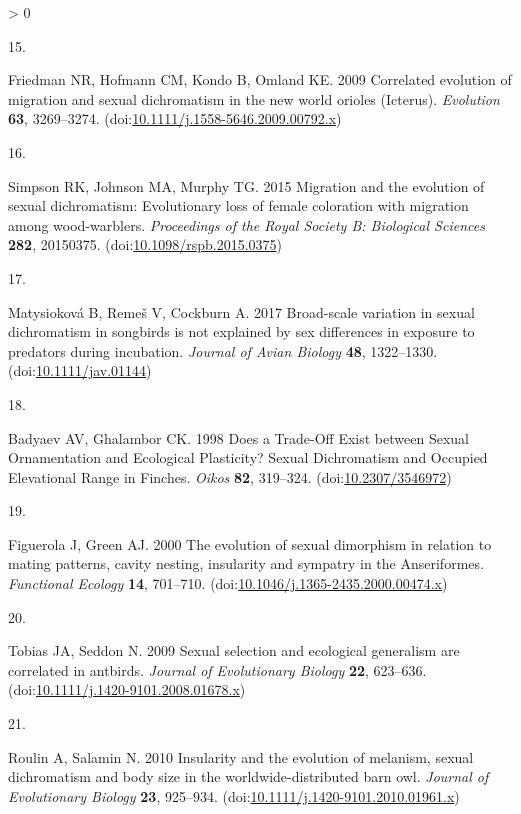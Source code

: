 \documentclass[
  a4paper,
]{article}
\newlength{\cslhangindent}
\newlength{\csllabelwidth}
\newenvironment{CSLReferences}[2] %
 {%
  \setlength{\parindent}{0pt}
  \ifodd #1 \everypar{\setlength{\hangindent}{\cslhangindent}}\ignorespaces\fi
  \ifnum #2 > 0
  \setlength{\parskip}{#2\baselineskip}
  \fi
 }%
 {}
\newcommand{\CSLLeftMargin}[1]{\parbox[t]{\csllabelwidth}{#1}}
\newcommand{\CSLRightInline}[1]{\parbox[t]{\linewidth - \csllabelwidth}{#1}\break}
\begin{document}
\begin{CSLReferences}{0}{0}
\leavevmode\hypertarget{ref-friedman2009}{}%
\CSLLeftMargin{15. }
\CSLRightInline{Friedman NR, Hofmann CM, Kondo B, Omland KE. 2009
Correlated evolution of migration and sexual dichromatism in the new
world orioles ({Icterus}). \emph{Evolution} \textbf{63}, 3269--3274.
(doi:\href{https://doi.org/10.1111/j.1558-5646.2009.00792.x}{10.1111/j.1558-5646.2009.00792.x})}

\leavevmode\hypertarget{ref-simpson2015a}{}%
\CSLLeftMargin{16. }
\CSLRightInline{Simpson RK, Johnson MA, Murphy TG. 2015 Migration and
the evolution of sexual dichromatism: {Evolutionary} loss of female
coloration with migration among wood-warblers. \emph{Proceedings of the
Royal Society B: Biological Sciences} \textbf{282}, 20150375.
(doi:\href{https://doi.org/10.1098/rspb.2015.0375}{10.1098/rspb.2015.0375})}

\leavevmode\hypertarget{ref-matysiokova2017}{}%
\CSLLeftMargin{17. }
\CSLRightInline{Matysioková B, Remeš V, Cockburn A. 2017 Broad-scale
variation in sexual dichromatism in songbirds is not explained by sex
differences in exposure to predators during incubation. \emph{Journal of
Avian Biology} \textbf{48}, 1322--1330.
(doi:\href{https://doi.org/10.1111/jav.01144}{10.1111/jav.01144})}

\leavevmode\hypertarget{ref-badyaev1998}{}%
\CSLLeftMargin{18. }
\CSLRightInline{Badyaev AV, Ghalambor CK. 1998 Does a {Trade}-{Off
Exist} between {Sexual Ornamentation} and {Ecological Plasticity}?
{Sexual Dichromatism} and {Occupied Elevational Range} in {Finches}.
\emph{Oikos} \textbf{82}, 319--324.
(doi:\href{https://doi.org/10.2307/3546972}{10.2307/3546972})}

\leavevmode\hypertarget{ref-figuerola2000}{}%
\CSLLeftMargin{19. }
\CSLRightInline{Figuerola J, Green AJ. 2000 The evolution of sexual
dimorphism in relation to mating patterns, cavity nesting, insularity
and sympatry in the {Anseriformes}. \emph{Functional Ecology}
\textbf{14}, 701--710.
(doi:\href{https://doi.org/10.1046/j.1365-2435.2000.00474.x}{10.1046/j.1365-2435.2000.00474.x})}

\leavevmode\hypertarget{ref-tobias2009}{}%
\CSLLeftMargin{20. }
\CSLRightInline{Tobias JA, Seddon N. 2009 Sexual selection and
ecological generalism are correlated in antbirds. \emph{Journal of
Evolutionary Biology} \textbf{22}, 623--636.
(doi:\href{https://doi.org/10.1111/j.1420-9101.2008.01678.x}{10.1111/j.1420-9101.2008.01678.x})}

\leavevmode\hypertarget{ref-roulin2010}{}%
\CSLLeftMargin{21. }
\CSLRightInline{Roulin A, Salamin N. 2010 Insularity and the evolution
of melanism, sexual dichromatism and body size in the
worldwide-distributed barn owl. \emph{Journal of Evolutionary Biology}
\textbf{23}, 925--934.
(doi:\href{https://doi.org/10.1111/j.1420-9101.2010.01961.x}{10.1111/j.1420-9101.2010.01961.x})}


\end{CSLReferences}
\end{document}
